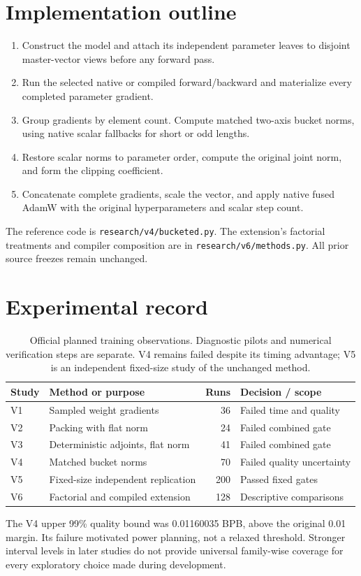 \documentclass[11pt]{article}
\newcommand{\code}[1]{\texttt{#1}}
\begin{document}
\section{Implementation outline}
\begin{enumerate}
\item Construct the model and attach its independent parameter leaves to
disjoint master-vector views before any forward pass.
\item Run the selected native or compiled forward/backward and materialize
every completed parameter gradient.
\item Group gradients by element count. Compute matched two-axis bucket norms,
using native scalar fallbacks for short or odd lengths.
\item Restore scalar norms to parameter order, compute the original joint norm,
and form the clipping coefficient.
\item Concatenate complete gradients, scale the vector, and apply native fused
AdamW with the original hyperparameters and scalar step count.
\end{enumerate}
The reference code is \code{research/v4/bucketed.py}. The extension's factorial
treatments and compiler composition are in \code{research/v6/methods.py}.
All prior source freezes remain unchanged.

\section{Experimental record}
\begin{table}[h]
\centering
\small
\begin{tabular}{llrl}
\toprule
Study & Method or purpose & Runs & Decision / scope\\
\midrule
V1 & Sampled weight gradients & 36 & Failed time and quality\\
V2 & Packing with flat norm & 24 & Failed combined gate\\
V3 & Deterministic adjoints, flat norm & 41 & Failed combined gate\\
V4 & Matched bucket norms & 70 & Failed quality uncertainty\\
V5 & Fixed-size independent replication & 200 & Passed fixed gates\\
V6 & Factorial and compiled extension & 128 & Descriptive comparisons\\
\bottomrule
\end{tabular}
\caption{Official planned training observations. Diagnostic pilots and numerical
verification steps are separate. V4 remains failed despite its timing advantage;
V5 is an independent fixed-size study of the unchanged method.}
\end{table}
The V4 upper 99\% quality bound was 0.01160035 BPB, above the original 0.01
margin. Its failure motivated power planning, not a relaxed threshold. Stronger
interval levels in later studies do not provide universal family-wise coverage
for every exploratory choice made during development.
\end{document}

